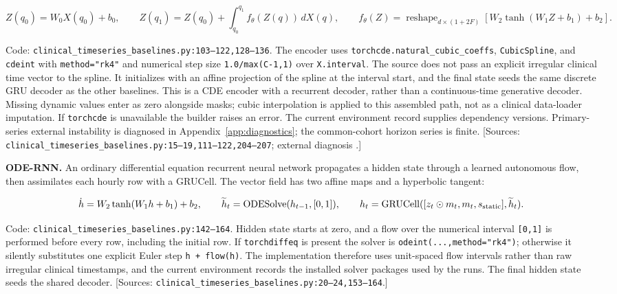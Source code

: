 \[
Z(q_0)=W_0X(q_0)+b_0,\qquad
Z(q_1)=Z(q_0)+\int_{q_0}^{q_1} f_\theta(Z(q))\,dX(q),\qquad
f_\theta(Z)=\operatorname{reshape}_{d\times(1+2F)}\!\left[W_2\tanh(W_1Z+b_1)+b_2\right].
\]


Code: \texttt{clinical\_\allowbreak{}timeseries\_\allowbreak{}baselines.\allowbreak{}py:\allowbreak{}103–\allowbreak{}122,\allowbreak{}128–\allowbreak{}136}. The encoder uses \texttt{torchcde.\allowbreak{}natural\_\allowbreak{}cubic\_\allowbreak{}coeffs}, \texttt{CubicSpline}, and \texttt{cdeint} with \texttt{method=\allowbreak{}"rk4"} and numerical step size \texttt{1.\allowbreak{}0/\allowbreak{}max(C-1,\allowbreak{}1)} over \texttt{X.\allowbreak{}interval}. The source does not pass an explicit irregular clinical time vector to the spline. It initializes with an affine projection of the spline at the interval start, and the final state seeds the same discrete GRU decoder as the other baselines. This is a CDE encoder with a recurrent decoder, rather than a continuous-time generative decoder. Missing dynamic values enter as zero alongside masks; cubic interpolation is applied to this assembled path, not as a clinical data-loader imputation. If \texttt{torchcde} is unavailable the builder raises an error. The current environment record supplies dependency versions. Primary-series external instability is diagnosed in Appendix~\ref{app:diagnostics}; the common-cohort horizon series is finite. [Sources: \texttt{clinical\_\allowbreak{}timeseries\_\allowbreak{}baselines.\allowbreak{}py:\allowbreak{}15–\allowbreak{}19,\allowbreak{}111–\allowbreak{}122,\allowbreak{}204–\allowbreak{}207}; external diagnosis .]

\textbf{ODE-RNN.} An ordinary differential equation recurrent neural network propagates a hidden state through a learned autonomous flow, then assimilates each hourly row with a GRUCell. The vector field has two affine maps and a hyperbolic tangent:

\[
\dot h=W_2\tanh(W_1h+b_1)+b_2,\qquad
\widetilde h_t=\operatorname{ODESolve}(h_{t-1},[0,1]),\qquad
h_t=\operatorname{GRUCell}([z_t\odot m_t,m_t,s_{\rm static}],\widetilde h_t).
\]


Code: \texttt{clinical\_\allowbreak{}timeseries\_\allowbreak{}baselines.\allowbreak{}py:\allowbreak{}142–\allowbreak{}164}. Hidden state starts at zero, and a flow over the numerical interval \texttt{[0,\allowbreak{}1]} is performed before every row, including the initial row. If \texttt{torchdiffeq} is present the solver is \texttt{odeint(.\allowbreak{}.\allowbreak{}.\allowbreak{},\allowbreak{}method=\allowbreak{}"rk4")}; otherwise it silently substitutes one explicit Euler step \texttt{h + flow(h)}. The implementation therefore uses unit-spaced flow intervals rather than raw irregular clinical timestamps, and the current environment records the installed solver packages used by the runs. The final hidden state seeds the shared decoder. [Sources: \texttt{clinical\_\allowbreak{}timeseries\_\allowbreak{}baselines.\allowbreak{}py:\allowbreak{}20–\allowbreak{}24,\allowbreak{}153–\allowbreak{}164}.]

